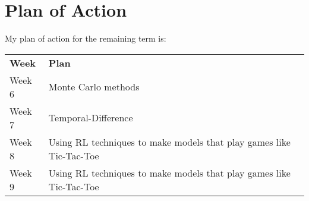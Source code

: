 \section{Plan of Action}

My plan of action for the remaining term is:

\begin{table}[h!]
\centering
    \begin{tabular}{ >{\centering\arraybackslash}m{3cm}>{\arraybackslash}m{12cm} }
        \rule{0pt}{2em}\textbf{Week} & \rule{0pt}{2em}\textbf{Plan} \\
        \rule{0pt}{2em}Week 6 & \rule{0pt}{2em}Monte Carlo methods \\
        \rule{0pt}{2em}Week 7 & \rule{0pt}{2em}Temporal-Difference \\
        \rule{0pt}{2em}Week 8 & \rule{0pt}{2em}Using RL techniques to make models that play games like Tic-Tac-Toe \\
        \rule{0pt}{2em}Week 9 & \rule{0pt}{2em}Using RL techniques to make models that play games like Tic-Tac-Toe \\
    \end{tabular}
\end{table}